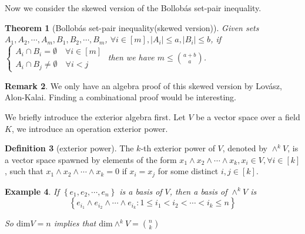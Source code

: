 \documentclass{article}
\newtheorem{theorem}{Theorem}[section]
\newtheorem{example}[theorem]{Example}
\theoremstyle{definition}
\newtheorem{remark}[theorem]{Remark}
\newtheorem{definition}[theorem]{Definition}
\begin{document}
Now we consider the skewed version of the Bollob\'as set-pair inequality.

\begin{theorem}[Bollob\'as set-pair inequality(skewed version)\cite{2023Bollobasskew}]
    Given sets $A_1,A_2,\cdots,A_m,B_1,B_2,\cdots,B_m$, $\forall i \in \left [ m \right ], \left | A_i \right |\le a,\left | B_i \right |\le b$, if $\left\{\begin{matrix} A_i\cap B_i =\emptyset \quad \forall i\in \left [ m \right ] 
 \\A_i \cap B_j \neq \emptyset \quad \forall i < j
\end{matrix}\right.$
then we have $m \le \binom{a+b}{a}$. 
\end{theorem}

\begin{remark}
    We only have an algebra proof of this skewed version by Lov\'asz, Alon-Kalai\cite{ALON1985211}. Finding a combinational proof would be interesting. 
\end{remark}

We briefly introduce the exterior algebra first. Let $V$ be a vector space over a field $K$, we introduce an operation exterior power.

\begin{definition}[exterior power]
    The $k$-th exterior power of $V$, denoted by $\wedge^k V$, is a vector space spawned by elements of the form $x_1 \wedge x_2 \wedge \cdots \wedge x_k,x_i \in V,\forall i \in \left [ k \right ]$, such that $x_1 \wedge x_2 \wedge \cdots \wedge x_k=0$ if $x_i=x_j$ for some distinct $i,j\in \left [ k \right ]$.
\end{definition}

\begin{example}
    If $\left \{ e_1,e_2,\cdots ,e_n \right \} $ is a basis of $V$, then a basis of $\wedge^k V$ is $$\left \{ e_{i_1} \wedge e_{i_2} \wedge \cdots \wedge e_{i_k}: 1 \le i_1<i_2<\cdots <i_k\le n \right \} $$

    So $\text{dim} V=n$ implies that $\text{dim} \wedge^k V=\binom{n}{k}$
\end{example}
\end{document}
